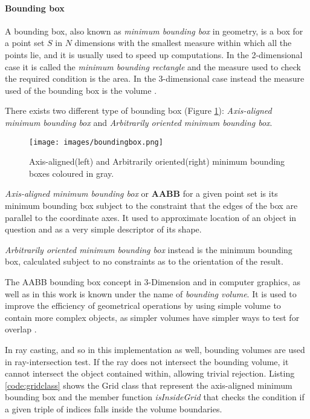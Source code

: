 \documentclass[12pt,a4paper]{extarticle}
\newcommand{\linespace}{\vspace{8pt}}
\begin{document}
\paragraph{Bounding box}

A bounding box, also known as \textit{minimum bounding box} in geometry, is a box for a point set $S$ in $N$ dimensions with the smallest measure within which all the points lie, and it is usually used to speed up computations. In the 2-dimensional case it is called the \textit{minimum bounding rectangle} and the measure used to check the required condition is the area. In the 3-dimensional case instead the measure used of the bounding box is the volume \cite{wiki_min_bound:1}.
\linespace

There exists two different type of bounding box (Figure \ref{fig:boundingbox}): \textit{Axis-aligned minimum bounding box} and \textit{Arbitrarily oriented minimum bounding box}.

\begin{figure}[hbtp]
\centering
\texttt{[image: images/boundingbox.png]}
\caption{Axis-aligned(left) and Arbitrarily oriented(right) minimum bounding boxes coloured in gray.}
\label{fig:boundingbox}
\end{figure}


\textit{Axis-aligned minimum bounding box} or \textbf{AABB} for a given point set is its minimum bounding box subject to the constraint that the edges of the box are parallel to the coordinate axes. It used to approximate location of an object in question and as a very simple descriptor of its shape.

\textit{Arbitrarily oriented minimum bounding box} instead is the minimum bounding box, calculated subject to no constraints as to the orientation of the result.
\linespace

The AABB bounding box concept in 3-Dimension and in computer graphics, as well as in this work is known under the name of \textit{bounding volume}. It is used to improve the efficiency of geometrical operations by using simple volume to contain more complex objects, as simpler volumes have simpler ways to test for overlap \cite{wiki_bound_volume:1}.

In ray casting, and so in this implementation as well, bounding volumes are used in ray-intersection test. If the ray does not intersect the bounding volume, it cannot intersect the object contained within, allowing trivial rejection. Listing \ref{code:gridclass} shows the Grid class that represent the axis-aligned minimum bounding box and the member function \textit{isInsideGrid} that checks the condition if a given triple of indices falls inside the volume boundaries.
\end{document}
